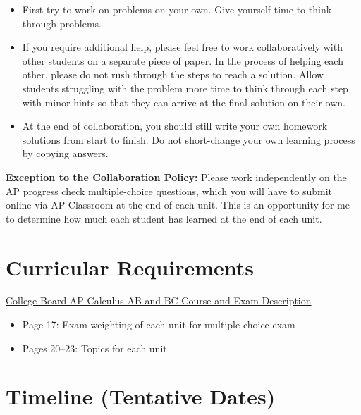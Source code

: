 \documentclass[12pt,fleqn]{article}
\providecommand{\tightlist}{%
  \setlength{\itemsep}{0pt}\setlength{\parskip}{0pt}}
\begin{document}
\begin{itemize}
\tightlist
\item
  First try to work on problems on your own. Give yourself time to think through problems.
\item
  If you require additional help, please feel free to work collaboratively with other students on a separate piece of paper. In the process of helping each other, please do not rush through the steps to reach a solution. Allow students struggling with the problem more time to think through each step with minor hints so that they can arrive at the final solution on their own.
\item
  At the end of collaboration, you should still write your own homework solutions from start to finish. Do not short-change your own learning process by copying answers.
\end{itemize}

\textbf{Exception to the Collaboration Policy:} Please work independently on the AP progress check multiple-choice questions, which you will have to submit online via AP Classroom at the end of each unit. This is an opportunity for me to determine how much each student has learned at the end of each unit.

\hypertarget{curricular-requirements}{%
\section{Curricular Requirements}\label{curricular-requirements}}

\href{https://apcentral.collegeboard.org/pdf/ap-calculus-ab-bc-course-and-exam-description-0.pdf?course=ap-calculus-ab}{College Board AP Calculus AB and BC Course and Exam Description}

\begin{itemize}
\item
  Page 17: Exam weighting of each unit for multiple-choice exam
\item
  Pages 20--23: Topics for each unit
\end{itemize}

\newpage

\hypertarget{timeline-tentative-dates}{%
\section{Timeline (Tentative Dates)}\label{timeline-tentative-dates}}
\end{document}
